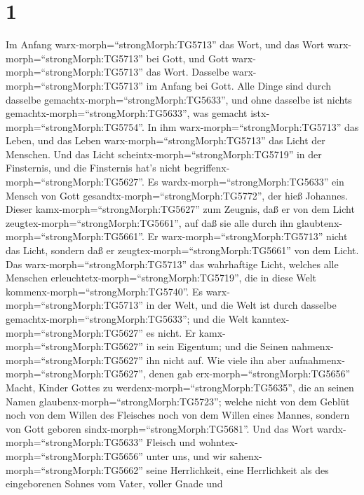 \hypertarget{section}{%
\section{1}\label{section}}

 Im Anfang warx-morph=``strongMorph:TG5713'' das Wort, und
das Wort warx-morph=``strongMorph:TG5713'' bei Gott, und Gott
warx-morph=``strongMorph:TG5713'' das Wort.  Dasselbe
warx-morph=``strongMorph:TG5713'' im Anfang bei Gott.  Alle
Dinge sind durch dasselbe gemachtx-morph=``strongMorph:TG5633'', und
ohne dasselbe ist nichts gemachtx-morph=``strongMorph:TG5633'', was
gemacht istx-morph=``strongMorph:TG5754''.  In ihm
warx-morph=``strongMorph:TG5713'' das Leben, und das Leben
warx-morph=``strongMorph:TG5713'' das Licht der Menschen. 
Und das Licht scheintx-morph=``strongMorph:TG5719'' in der Finsternis,
und die Finsternis hat's nicht begriffenx-morph=``strongMorph:TG5627''.
 Es wardx-morph=``strongMorph:TG5633'' ein Mensch von Gott
gesandtx-morph=``strongMorph:TG5772'', der hieß Johannes. 
Dieser kamx-morph=``strongMorph:TG5627'' zum Zeugnis, daß er von dem
Licht zeugtex-morph=``strongMorph:TG5661'', auf daß sie alle durch ihn
glaubtenx-morph=``strongMorph:TG5661''.  Er
warx-morph=``strongMorph:TG5713'' nicht das Licht, sondern daß er
zeugtex-morph=``strongMorph:TG5661'' von dem Licht.  Das
warx-morph=``strongMorph:TG5713'' das wahrhaftige Licht, welches alle
Menschen erleuchtetx-morph=``strongMorph:TG5719'', die in diese Welt
kommenx-morph=``strongMorph:TG5740''.  Es
warx-morph=``strongMorph:TG5713'' in der Welt, und die Welt ist durch
dasselbe gemachtx-morph=``strongMorph:TG5633''; und die Welt
kanntex-morph=``strongMorph:TG5627'' es nicht.  Er
kamx-morph=``strongMorph:TG5627'' in sein Eigentum; und die Seinen
nahmenx-morph=``strongMorph:TG5627'' ihn nicht auf.  Wie
viele ihn aber aufnahmenx-morph=``strongMorph:TG5627'', denen gab
erx-morph=``strongMorph:TG5656'' Macht, Kinder Gottes zu
werdenx-morph=``strongMorph:TG5635'', die an seinen Namen
glaubenx-morph=``strongMorph:TG5723'';  welche nicht von
dem Geblüt noch von dem Willen des Fleisches noch von dem Willen eines
Mannes, sondern von Gott geboren sindx-morph=``strongMorph:TG5681''.
 Und das Wort wardx-morph=``strongMorph:TG5633'' Fleisch
und wohntex-morph=``strongMorph:TG5656'' unter uns, und wir
sahenx-morph=``strongMorph:TG5662'' seine Herrlichkeit, eine
Herrlichkeit als des eingeborenen Sohnes vom Vater, voller Gnade und
